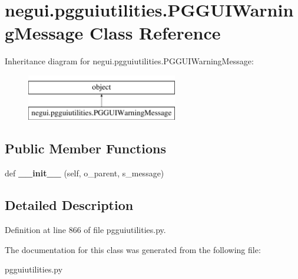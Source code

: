 \hypertarget{classnegui_1_1pgguiutilities_1_1PGGUIWarningMessage}{}\section{negui.\+pgguiutilities.\+P\+G\+G\+U\+I\+Warning\+Message Class Reference}
\label{classnegui_1_1pgguiutilities_1_1PGGUIWarningMessage}
Inheritance diagram for negui.\+pgguiutilities.\+P\+G\+G\+U\+I\+Warning\+Message\+:\begin{figure}[H]
\begin{center}
\leavevmode
\includegraphics[height=2.000000cm]{classnegui_1_1pgguiutilities_1_1PGGUIWarningMessage}
\end{center}
\end{figure}
\subsection*{Public Member Functions}
\begin{DoxyCompactItemize}
\item 
def {\bfseries \+\_\+\+\_\+init\+\_\+\+\_\+} (self, o\+\_\+parent, s\+\_\+message)\hypertarget{classnegui_1_1pgguiutilities_1_1PGGUIWarningMessage_a0ac338d8bcaa1e19be56a0b71a222d6e}{}\label{classnegui_1_1pgguiutilities_1_1PGGUIWarningMessage_a0ac338d8bcaa1e19be56a0b71a222d6e}

\end{DoxyCompactItemize}


\subsection{Detailed Description}


Definition at line 866 of file pgguiutilities.\+py.



The documentation for this class was generated from the following file\+:\begin{DoxyCompactItemize}
\item 
pgguiutilities.\+py\end{DoxyCompactItemize}
